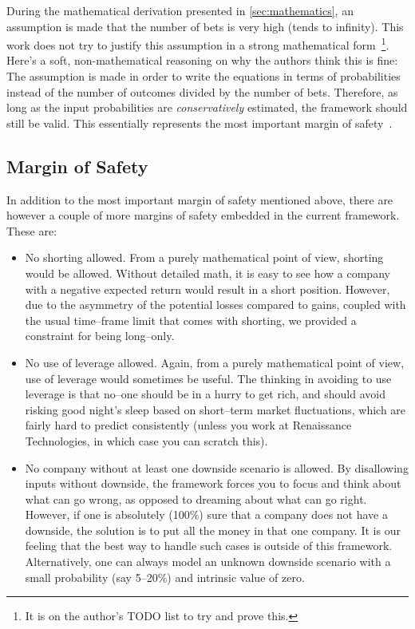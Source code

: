 \documentclass{article}
\begin{document}
During the mathematical derivation presented in \autoref{sec:mathematics}, an
assumption is made that the number of bets is very high (tends to infinity).
This work does not try to justify this assumption in a strong mathematical
form~\footnote{It is on the author's TODO list to try and prove this.}. Here's a
soft, non-mathematical reasoning on why the authors think this is fine: The
assumption is made in order to write the equations in terms of probabilities
instead of the number of outcomes divided by the number of bets. Therefore, as
long as the input probabilities are \textit{conservatively} estimated, the
framework should still be valid. This essentially represents the most important
margin of safety~\cite{intelligentInvestor}.

\subsection{Margin of Safety}
\label{sec:safetyMargin}

In addition to the most important margin of safety mentioned above, there are
however a couple of more margins of safety embedded in the current framework.
These are:
\begin{itemize}
    \item No shorting allowed. From a purely mathematical point of view,
    shorting would be allowed. Without detailed math, it is easy to see how a
    company with a negative expected return would result in a short position.
    However, due to the asymmetry of the potential losses compared to gains,
    coupled with the usual time--frame limit that comes with shorting, we
    provided a constraint for being long--only.
    \item No use of leverage allowed. Again, from a purely mathematical point of
    view, use of leverage would sometimes be useful. The thinking in avoiding to
    use leverage is that no--one should be in a hurry to get rich, and should
    avoid risking good night's sleep based on short--term market fluctuations,
    which are fairly hard to predict consistently (unless you work at
    Renaissance Technologies, in which case you can scratch this).
    \item No company without at least one downside scenario is allowed. By
    disallowing inputs without downside, the framework forces you to focus and
    think about what can go wrong, as opposed to dreaming about what can go
    right. However, if one is absolutely (100\%) sure that a company does not
    have a downside, the solution is to put all the money in that one company.
    It is our feeling that the best way to handle such cases is outside of this
    framework. Alternatively, one can always model an unknown downside scenario
    with a small probability (say 5--20\%) and intrinsic value of zero.
\end{itemize}
\end{document}
